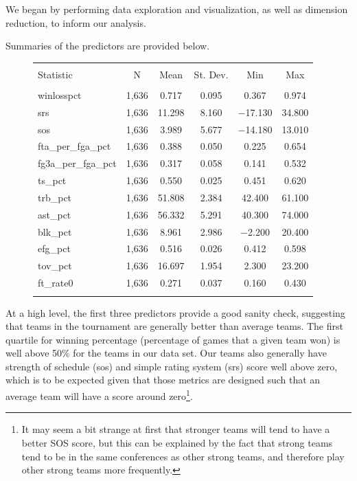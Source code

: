 \documentclass[10pt,a4paper, hidelinks]{article} %
\begin{document}
We began by performing data exploration and visualization, as well as dimension reduction, to inform our analysis.

Summaries of the predictors are provided below.
\begin{figure}[H]
	\centering
	\label{} 
	\begin{tabular}{@{\extracolsep{5pt}}lccccc} 
		\hline \\[-1.8ex] 
		Statistic & \multicolumn{1}{c}{N} & \multicolumn{1}{c}{Mean} & \multicolumn{1}{c}{St. Dev.} & \multicolumn{1}{c}{Min} & \multicolumn{1}{c}{Max} \\ 
		\hline \\[-1.8ex] 
		winlosspct & 1,636 & 0.717 & 0.095 & 0.367 & 0.974 \\ 
		srs & 1,636 & 11.298 & 8.160 & $-$17.130 & 34.800 \\ 
		sos & 1,636 & 3.989 & 5.677 & $-$14.180 & 13.010 \\ 
		fta\_per\_fga\_pct & 1,636 & 0.388 & 0.050 & 0.225 & 0.654 \\ 
		fg3a\_per\_fga\_pct & 1,636 & 0.317 & 0.058 & 0.141 & 0.532 \\ 
		ts\_pct & 1,636 & 0.550 & 0.025 & 0.451 & 0.620 \\ 
		trb\_pct & 1,636 & 51.808 & 2.384 & 42.400 & 61.100 \\ 
		ast\_pct & 1,636 & 56.332 & 5.291 & 40.300 & 74.000 \\ 
		blk\_pct & 1,636 & 8.961 & 2.986 & $-$2.200 & 20.400 \\ 
		efg\_pct & 1,636 & 0.516 & 0.026 & 0.412 & 0.598 \\ 
		tov\_pct & 1,636 & 16.697 & 1.954 & 2.300 & 23.200 \\ 
		ft\_rate0 & 1,636 & 0.271 & 0.037 & 0.160 & 0.430 \\ 
		\hline \\[-1.8ex] 
	\end{tabular} 
	\caption{} 
\end{figure}

At a high level, the first three predictors provide a good sanity check, suggesting that teams in the tournament are generally better than average teams. The first quartile for winning percentage (percentage of games that a given team won) is well above 50\% for the teams in our data set. Our teams also generally have strength of schedule (sos) and simple rating system (srs) score well above zero, which is to be expected given that those metrics are designed such that an average team will have a score around zero\footnote{It may seem a bit strange at first that stronger teams will tend to have a better SOS score, but this can be explained by the fact that strong teams tend to be in the same conferences as other strong teams, and therefore play other strong teams more frequently.}. 
\end{document}
